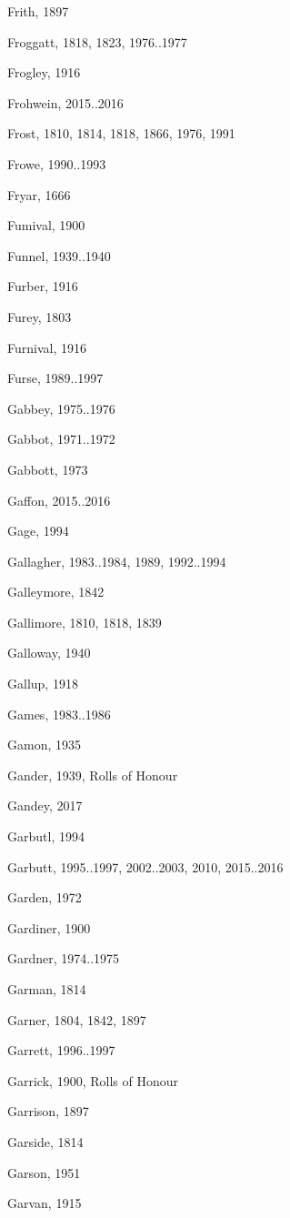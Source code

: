 {\begin{theindex}
\item Frith, 1897
\item Froggatt, 1818, 1823, 1976..1977
\item Frogley, 1916
\item Frohwein, 2015..2016
\item Frost, 1810, 1814, 1818, 1866, 1976, 1991
\item Frowe, 1990..1993
\item Fryar, 1666
\item Fumival, 1900
\item Funnel, 1939..1940
\item Furber, 1916
\item Furey, 1803
\item Furnival, 1916
\item Furse, 1989..1997
\item Gabbey, 1975..1976
\item Gabbot, 1971..1972
\item Gabbott, 1973
\item Gaffon, 2015..2016
\item Gage, 1994
\item Gallagher, 1983..1984, 1989, 1992..1994
\item Galleymore, 1842
\item Gallimore, 1810, 1818, 1839
\item Galloway, 1940
\item Gallup, 1918
\item Games, 1983..1986
\item Gamon, 1935
\item Gander, 1939, Rolls of Honour
\item Gandey, 2017
\item Garbutl, 1994
\item Garbutt, 1995..1997, 2002..2003, 2010, 2015..2016
\item Garden, 1972
\item Gardiner, 1900
\item Gardner, 1974..1975
\item Garman, 1814
\item Garner, 1804, 1842, 1897
\item Garrett, 1996..1997
\item Garrick, 1900, Rolls of Honour
\item Garrison, 1897
\item Garside, 1814
\item Garson, 1951
\item Garvan, 1915

\end{theindex}}
